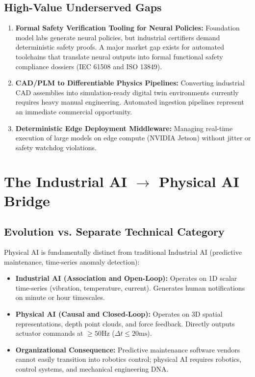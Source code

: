 \documentclass[11pt,a4paper]{article}
\begin{document}
\subsection{High-Value Underserved Gaps}
\begin{enumerate}
    \item \textbf{Formal Safety Verification Tooling for Neural Policies:} Foundation model labs generate neural policies, but industrial certifiers demand deterministic safety proofs. A major market gap exists for automated toolchains that translate neural outputs into formal functional safety compliance dossiers (IEC 61508 and ISO 13849).
    \item \textbf{CAD/PLM to Differentiable Physics Pipelines:} Converting industrial CAD assemblies into simulation-ready digital twin environments currently requires heavy manual engineering. Automated ingestion pipelines represent an immediate commercial opportunity.
    \item \textbf{Deterministic Edge Deployment Middleware:} Managing real-time execution of large models on edge compute (NVIDIA Jetson) without jitter or safety watchdog violations.
\end{enumerate}

\section{The Industrial AI \texorpdfstring{$\rightarrow$}{to} Physical AI Bridge}

\subsection{Evolution vs. Separate Technical Category}
Physical AI is fundamentally distinct from traditional Industrial AI (predictive maintenance, time-series anomaly detection):
\begin{itemize}
    \item \textbf{Industrial AI (Association and Open-Loop):} Operates on 1D scalar time-series (vibration, temperature, current). Generates human notifications on minute or hour timescales.
    \item \textbf{Physical AI (Causal and Closed-Loop):} Operates on 3D spatial representations, depth point clouds, and force feedback. Directly outputs actuator commands at $\ge 50\text{Hz}$ ($\Delta t \le 20\text{ms}$).
    \item \textbf{Organizational Consequence:} Predictive maintenance software vendors cannot easily transition into robotics control; physical AI requires robotics, control systems, and mechanical engineering DNA.
\end{itemize}
\end{document}
